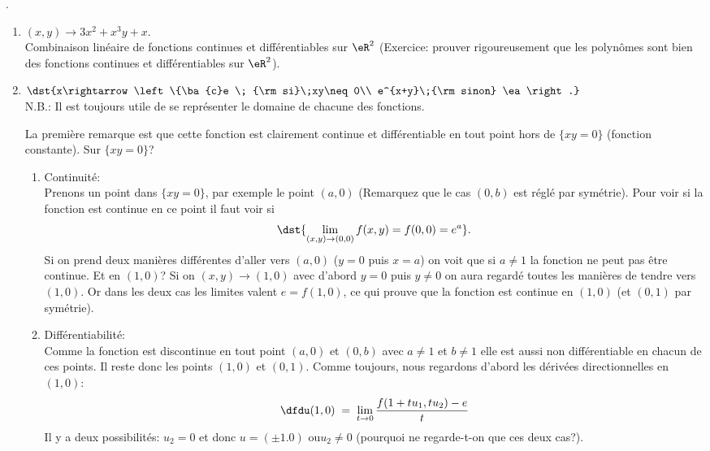 .
\begin{enumerate}
\item $(x,y)\rightarrow  3x^2+x^3y+x$.\\
Combinaison linéaire de fonctions continues et différentiables sur $\eR^2$ (Exercice: prouver rigoureusement que les polyn\^{o}mes sont bien des fonctions continues et différentiables sur $\eR^2$).

\item  $\dst{x\rightarrow \left\{\ba{c}e \; {\rm si}\;xy\neq0\\
              			        e^{x+y}\;{\rm sinon} \ea\right.}$\\
N.B.: Il est toujours utile de se représenter le domaine de chacune des fonctions. 

\noindent La première remarque est que cette fonction est clairement continue et différentiable en tout point hors de $\{xy=0\}$ (fonction constante). Sur $\{xy=0\}$?
\begin{enumerate}
\item Continuité:\\
Prenons un point dans $\{xy=0\}$, par exemple le point $(a,0)$ (Remarquez que le cas $(0,b)$ est réglé par symétrie). Pour voir si la fonction est continue en ce point il faut voir si \[\dst{\lim_{(x,y)\rightarrow (0,0)}f(x,y)=f(0,0)=e^a}.\] Si on prend deux manières différentes d'aller vers $(a,0)$ ($y=0$ puis $x=a$) on voit que si $a \neq1$ la fonction ne peut pas \^{e}tre continue. Et en $(1,0)$? Si on $(x,y)\rightarrow (1,0)$ avec d'abord $y=0$ puis $y\neq0$ on aura regardé toutes les manières de tendre vers $(1,0)$. Or dans les deux cas les limites valent $e = f(1,0)$, ce qui prouve que la fonction est continue en $(1,0)$ (et $(0,1)$ par symétrie).

\item Différentiabilité:\\
Comme la fonction est discontinue en tout point $(a,0)$ et $(0,b)$ avec $a\neq1$ et $b\neq1$ elle est aussi non différentiable en chacun de ces points. Il reste donc les points $(1,0)$ et $(0,1)$. Comme toujours, nous regardons d'abord les dérivées directionnelles en $(1,0)$:
\[\dfdu(1,0) \;=\;\lim_{t\rightarrow 0}\frac{f(1+tu_1,tu_2)-e}{t}\]
Il y a deux possibilités: $u_2=0$ et donc $u=(\pm1.0)$ ou$u_2\neq0$ (pourquoi ne regarde-t-on que ces deux cas?).


\end{enumerate}
\end{enumerate}
